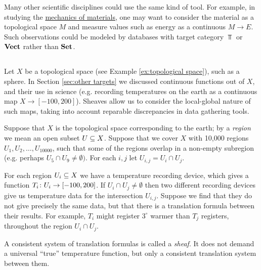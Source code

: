 \documentclass[CT4S-EN-RU]{subfiles}
\begin{document}
\begin{application}

Many other scientific disciplines could use the same kind of tool. For example, in studying the \href{http://en.wikipedia.org/wiki/Strength_of_materials}{\text mechanics of materials}, one may want to consider the material as a topological space $M$ and measure values such as energy as a continuous $M\to E$. Such observations could be modeled by databases with target category $\Top$ or $\Vect$ rather than $\Set$.

\end{application}


\subsection{}\label{sec:sheaves}

Let $X$ be a topological space (see Example \ref{ex:topological space}), such as a sphere. In Section \ref{sec:other targets} we discussed continuous functions out of $X$, and their use in science (e.g. recording temperatures on the earth as a continuous map $X\to[-100,200]$). Sheaves allow us to consider the local-global nature of such maps, taking into account reparable discrepancies in data gathering tools. 

\begin{application}\label{app:sheaves of temperature}

Suppose that $X$ is the topological space corresponding to the earth; by a {\em region} we mean an open subset $U\ss X$. Suppose that we cover $X$ with 10,000 regions $U_1,U_2,\ldots,U_{10000}$, such that some of the regions overlap in a non-empty subregion (e.g. perhaps $U_5\cap U_9\neq\emptyset)$. For each $i,j$ let $U_{i,j}=U_i\cap U_j$. 

For each region $U_i\ss X$ we have a temperature recording device, which gives a function $T_i\taking U_i\to[-100,200]$. If $U_i\cap U_j\neq\emptyset$ then two different recording devices give us temperature data for the intersection $U_{i,j}$. Suppose we find that they do not give precisely the same data, but that there is a translation formula between their results. For example, $T_i$ might register $3^\circ$ warmer than $T_j$ registers, throughout the region $U_i\cap U_j$.

A consistent system of translation formulas is called a {\em sheaf}. It does not demand a universal “true” temperature function, but only a consistent translation system between them. 

\end{application}
\end{document}
